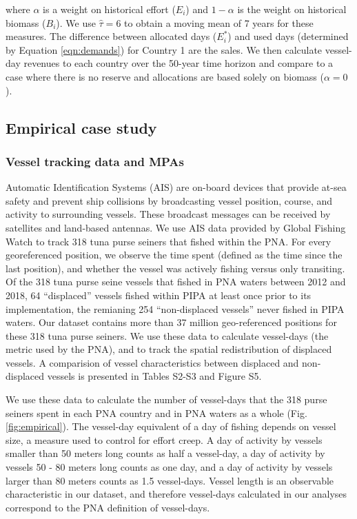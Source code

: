 \documentclass[12pt]{article}
\begin{document}
\noindent where $\alpha$ is a weight on historical effort ($E_i$) and $1-\alpha$ is the weight on historical biomass ($B_i$). We use $\hat{\tau}= 6$ to obtain a moving mean of 7 years for these measures. The difference between allocated days ($E_i^*$) and used days (determined by Equation \ref{eqn:demands}) for Country 1 are the sales. We then calculate vessel-day revenues to each country over the 50-year time horizon and compare to a case where there is no reserve and allocations are based solely on biomass ($\alpha = 0$).

\subsection{Empirical case study}

\subsubsection{Vessel tracking data and MPAs}

Automatic Identification Systems (AIS) are on-board devices that provide at-sea safety and prevent ship collisions by broadcasting vessel position, course, and activity to surrounding vessels. These broadcast messages can be received by satellites and land-based antennas. We use AIS data provided by Global Fishing Watch \cite{kroodsma_2018} to track 318 tuna purse seiners that fished within the PNA. For every georeferenced position, we observe the time spent (defined as the time since the last position), and whether the vessel was actively fishing versus only transiting. Of the 318 tuna purse seine vessels that fished in PNA waters between 2012 and 2018, 64 ``displaced'' vessels fished within PIPA at least once prior to its implementation, the remianing 254 ``non-displaced vessels'' never fished in PIPA waters. Our dataset contains more than 37 million geo-referenced positions for these 318 tuna purse seiners. We use these data to calculate vessel-days (the metric used by the PNA), and to track the spatial redistribution of displaced vessels. A comparision of vessel characteristics between displaced and non-displaced vessels is presented in Tables S2-S3 and Figure S5.

We use these data to calculate the number of vessel-days that the 318 purse seiners spent in each PNA country and in PNA waters as a whole (Fig. \ref{fig:empirical}). The vessel-day equivalent of a day of fishing depends on vessel size, a measure used to control for effort creep. A day of activity by vessels smaller than 50 meters long counts as half a vessel-day, a day of activity by vessels 50 - 80 meters long counts as one day, and a day of activity by vessels larger than 80 meters counts as 1.5 vessel-days. Vessel length is an observable characteristic in our dataset, and therefore vessel-days calculated in our analyses correspond to the PNA definition of vessel-days.
\end{document}
